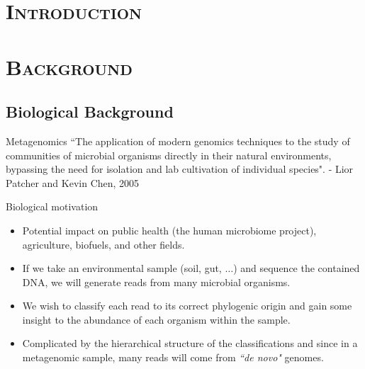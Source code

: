 \documentclass[xcolor=x11names,compress]{beamer}
\renewcommand{\(}{\begin{columns}}
\renewcommand{\)}{\end{columns}}
\newcommand{\<}[1]{\begin{column}{#1}}
\renewcommand{\>}{\end{column}}
\begin{document}
\section{\scshape Introduction}


\section{\scshape Background}
\subsection{Biological Background}
\begin{frame}{Metagenomics}
``The application of modern genomics techniques to the study of communities of microbial organisms directly in their natural environments, bypassing the need for isolation and lab cultivation of individual species". - Lior Patcher and Kevin Chen, 2005
\end{frame}
\begin{frame}{Biological motivation}

\begin{itemize}
	\item Potential impact on public health (the human microbiome project), agriculture, biofuels, and other fields.
	\item If we take an environmental sample (soil, gut, $\ldots$) and sequence the contained DNA, we will generate reads from many microbial organisms. 
	\item We wish to classify each read to its correct phylogenic origin and gain some insight to the abundance of each organism within the sample.
	\item Complicated by the hierarchical structure of the classifications and since in a metagenomic sample, many reads will come from \emph{``de novo"} genomes.
\end{itemize}
\end{frame}
\end{document}
